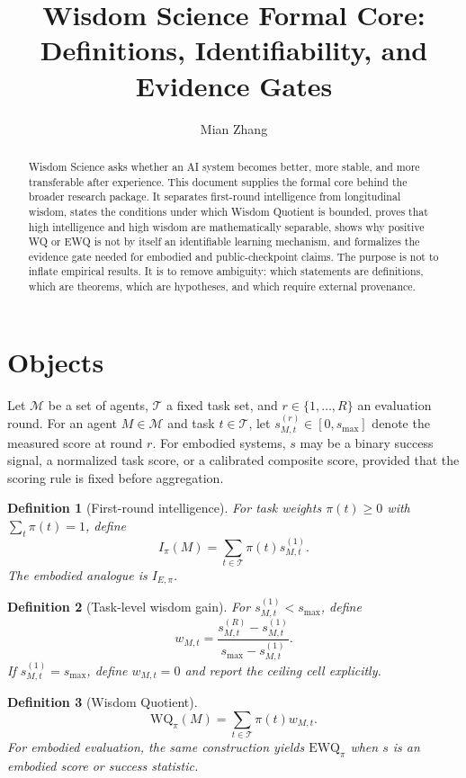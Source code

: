 \documentclass[11pt]{article}
\title{Wisdom Science Formal Core: Definitions, Identifiability, and Evidence Gates}
\author{Mian Zhang}
\date{}
\newtheorem{definition}{Definition}
\begin{document}
\maketitle

\begin{abstract}
Wisdom Science asks whether an AI system becomes better, more stable, and more transferable after experience.
This document supplies the formal core behind the broader research package.
It separates first-round intelligence from longitudinal wisdom, states the conditions under which Wisdom Quotient is bounded, proves that high intelligence and high wisdom are mathematically separable, shows why positive WQ or EWQ is not by itself an identifiable learning mechanism, and formalizes the evidence gate needed for embodied and public-checkpoint claims.
The purpose is not to inflate empirical results.
It is to remove ambiguity: which statements are definitions, which are theorems, which are hypotheses, and which require external provenance.
\end{abstract}

\section{Objects}

Let $\mathcal{M}$ be a set of agents, $\mathcal{T}$ a fixed task set, and $r\in\{1,\dots,R\}$ an evaluation round.
For an agent $M\in\mathcal{M}$ and task $t\in\mathcal{T}$, let $s_{M,t}^{(r)}\in[0,s_{\max}]$ denote the measured score at round $r$.
For embodied systems, $s$ may be a binary success signal, a normalized task score, or a calibrated composite score, provided that the scoring rule is fixed before aggregation.

\begin{definition}[First-round intelligence]
For task weights $\pi(t)\ge 0$ with $\sum_t\pi(t)=1$, define
\[
I_\pi(M)=\sum_{t\in\mathcal{T}}\pi(t)s_{M,t}^{(1)}.
\]
The embodied analogue is $I_{E,\pi}$.
\end{definition}

\begin{definition}[Task-level wisdom gain]
For $s_{M,t}^{(1)}<s_{\max}$, define
\[
w_{M,t}=\frac{s_{M,t}^{(R)}-s_{M,t}^{(1)}}{s_{\max}-s_{M,t}^{(1)}}.
\]
If $s_{M,t}^{(1)}=s_{\max}$, define $w_{M,t}=0$ and report the ceiling cell explicitly.
\end{definition}

\begin{definition}[Wisdom Quotient]
\[
\mathrm{WQ}_{\pi}(M)=\sum_{t\in\mathcal{T}}\pi(t)w_{M,t}.
\]
For embodied evaluation, the same construction yields $\mathrm{EWQ}_{\pi}$ when $s$ is an embodied score or success statistic.
\end{definition}
\end{document}

